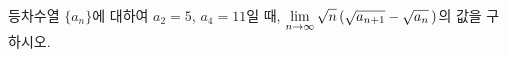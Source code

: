 등차수열 $\{a_n\}$에 대하여 $a_2=5$, $a_4=11$일 때, $\displaystyle\lim_{n\to\infty}\sqrt{n}\mkern3mu (\sqrt{a_{n+1}}-\sqrt{a_n}\mkern3mu )$의 값을 구하시오.
